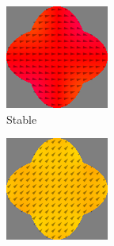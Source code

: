 \documentclass[11pt,a4paper,english]{article}
\begin{document}
\begin{figure}
     \centering
     \begin{subfigure}[b]{0.2\textwidth}
         \centering
         \includegraphics[width=\textwidth]{Figures/biaxial_island/BarrierMagnetization/mPlus_roundness0.60_a0.00.png}
         \caption*{Stable}
         \label{fig:barrier-magnetization-60x100_ortho}
     \end{subfigure}
     \begin{subfigure}[b]{0.2\textwidth}
         \centering
         \includegraphics[width=\textwidth]{Figures/biaxial_island/BarrierMagnetization/mPlus_roundness0.60_a0.79.png}

\end{subfigure}
\end{figure}
\end{document}
